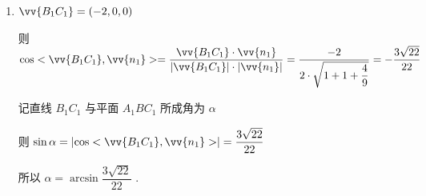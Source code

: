 \begin{enumerate}
\begin{jieda}
\begin{enumerate}
            所以 $\vv{{A}_{1}B} = \left( {0,2, - 3}\right) ,\vv{{A}_{1}{C}_{1}} = \left( {-2,2,0}\right)$
            
            设平面 ${A}_{1}B{C}_{1}$ 的一个法向量为 $\vv{{n}_{1}} = \left( {x,y,z}\right)$ ,则
            
            $\left\{  {\begin{array}{l} \vv{{n}_{1}} \cdot  \vv{{A}_{1}B} = 0 \\  \vv{{n}_{1}} \cdot  \vv{{A}_{1}{C}_{1}} = 0 \end{array},\text{ 即 }\left\{  \begin{array}{l} {2y} - {3z} = 0 \\   - {2x} + {2y} = 0 \end{array}\right. }\right.$
            
            取 $x = 1$ ,则 $y = 1,z = \dfrac{2}{3}$
            
            即 $\vv{{n}_{1}} = \left( {1,1,\dfrac{2}{3}}\right)$
            
            显然平面 ${A}_{1}{B}_{1}{C}_{1}$ 的一个法向量为 $\vv{{n}_{2}} = \left( {0,0,1}\right)$
            
            则 $\cos  < {B}_{1} - {A}_{1}{C}_{1} - B >  = \cos  < \vv{{n}_{1}},\vv{{n}_{2}} >  = \dfrac{\vv{{n}_{1}} \cdot  \vv{{n}_{2}}}{\left| \vv{{n}_{1}}\right|  \cdot  \left| \vv{{n}_{2}}\right| } = \dfrac{\dfrac{2}{3}}{\sqrt{1 + 1 + \dfrac{4}{9}} \cdot  1} = \dfrac{\sqrt{22}}{11}$
            
            所以二面角 ${B}_{1} - {A}_{1}{C}_{1} - B$ 的大小为 $\arccos \dfrac{\sqrt{22}}{11}$ .
            
            \item  $\vv{{B}_{1}{C}_{1}} = \left( {-2,0,0}\right)$
            
            则 $\cos  < \vv{{B}_{1}{C}_{1}},\vv{{n}_{1}} >  = \dfrac{\vv{{B}_{1}{C}_{1}} \cdot  \vv{{n}_{1}}}{\left| \vv{{B}_{1}{C}_{1}}\right|  \cdot  \left| \vv{{n}_{1}}\right| } = \dfrac{-2}{2 \cdot  \sqrt{1 + 1 + \dfrac{4}{9}}} =  - \dfrac{3\sqrt{22}}{22}$
            
            记直线 ${B}_{1}{C}_{1}$ 与平面 ${A}_{1}B{C}_{1}$ 所成角为 $\alpha$
            
            则 $\sin \alpha  = \left| {\cos  < \vv{{B}_{1}{C}_{1}},\vv{{n}_{1}} > }\right|  = \dfrac{3\sqrt{22}}{22}$
            
            所以 $\alpha  = \arcsin \dfrac{3\sqrt{22}}{22}$ .
        \end{enumerate}
    \end{jieda}
    

\end{enumerate}
